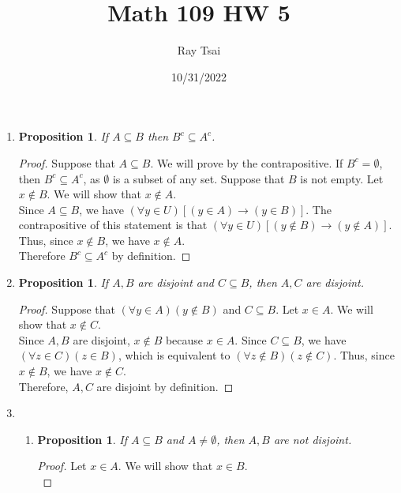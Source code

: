 \documentclass{article}
\title{Math 109 HW 5}
\author{Ray Tsai}
\date{10/31/2022}
\newtheorem{prop}[thm]{Proposition}
\begin{document}
 

\maketitle 

\begin{enumerate}
\item 
\begin{prop}
    If $A \subseteq B$ then $B^{c} \subseteq A^{c}$.
\end{prop}
\begin{proof}
Suppose that $A \subseteq B$. We will prove by the contrapositive. If $B^{c} = \emptyset$, then $B^{c} \subseteq A^{c}$, as $\emptyset$ is a subset of any set. Suppose that $B$ is not empty. Let $x \notin B$. We will show that $x \notin A$. \\

Since $A \subseteq B$, we have $(\forall y \in U)[(y \in A) \rightarrow (y \in B)]$. The contrapositive of this statement is that $(\forall y \in U)[(y \notin B) \rightarrow (y \notin A)]$. Thus, since $x \notin B$, we have $x \notin A$. \\

Therefore $B^{c} \subseteq A^{c}$ by definition.
\end{proof}

\item 
\begin{prop}
    If $A, B$ are disjoint and $C \subseteq B$, then $A, C$ are disjoint.
\end{prop}
\begin{proof}
Suppose that $(\forall y \in A)(y \notin B)$ and $C \subseteq B$. Let $x \in A$. We will show that $x \notin C$. \\

Since $A, B$ are disjoint, $x \notin B$ because $x \in A$. Since $C \subseteq B$, we have $(\forall z \in C)(z \in B)$, which is equivalent to $(\forall z \notin B)(z \notin C)$. Thus, since $x \notin B$, we have $x \notin C$. \\

Therefore, $A, C$ are disjoint by definition.
\end{proof}

\item \begin{enumerate}
    
    \item 
    \begin{prop}
        If $A \subseteq B$ and $A \neq \emptyset$, then $A, B$ are not disjoint.
    \end{prop}
    \begin{proof}
        Let $x \in A$. We will show that $x \in B$. \\
        

\end{proof}
\end{enumerate}
\end{enumerate}
\end{document}
